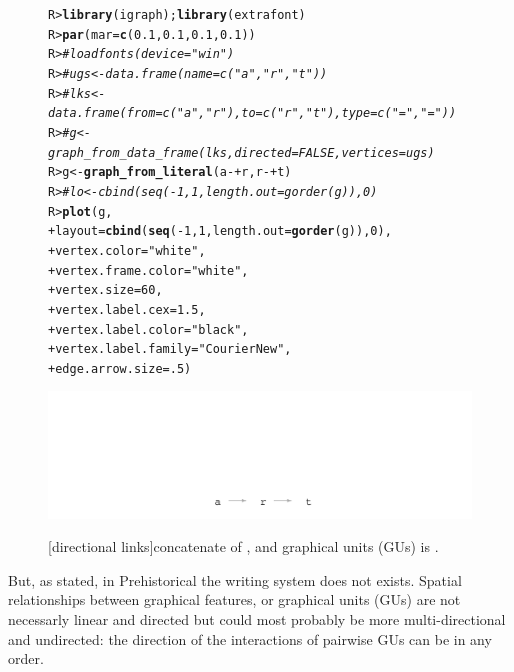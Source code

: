 \documentclass[article]{jss}\usepackage[]{graphicx}\usepackage[]{color}
\makeatletter
\def\maxwidth{ %
  \ifdim\Gin@nat@width>\linewidth
    \linewidth
  \else
    \Gin@nat@width
  \fi
}
\newcommand{\hlnum}[1]{\textcolor[rgb]{0.686,0.059,0.569}{#1}}%
\newcommand{\hlstr}[1]{\textcolor[rgb]{0.192,0.494,0.8}{#1}}%
\newcommand{\hlcom}[1]{\textcolor[rgb]{0.678,0.584,0.686}{\textit{#1}}}%
\newcommand{\hlopt}[1]{\textcolor[rgb]{0,0,0}{#1}}%
\newcommand{\hlstd}[1]{\textcolor[rgb]{0.345,0.345,0.345}{#1}}%
\newcommand{\hlkwb}[1]{\textcolor[rgb]{0.69,0.353,0.396}{#1}}%
\newcommand{\hlkwc}[1]{\textcolor[rgb]{0.333,0.667,0.333}{#1}}%
\newcommand{\hlkwd}[1]{\textcolor[rgb]{0.737,0.353,0.396}{\textbf{#1}}}%
\newenvironment{kframe}{%
 \def\at@end@of@kframe{}%
 \ifinner\ifhmode%
  \def\at@end@of@kframe{\end{minipage}}%
  \begin{minipage}{\columnwidth}%
 \fi\fi%
 \def\FrameCommand##1{\hskip\@totalleftmargin \hskip-\fboxsep
 \colorbox{shadecolor}{##1}\hskip-\fboxsep
     \hskip-\linewidth \hskip-\@totalleftmargin \hskip\columnwidth}%
 \MakeFramed {\advance\hsize-\width
   \@totalleftmargin\z@ \linewidth\hsize
   \@setminipage}}%
 {\par\unskip\endMakeFramed%
 \at@end@of@kframe}
\newenvironment{knitrout}{}{} %
\makeatother
\begin{document}
\begin{figure}[H]
\begin{knitrout}
\color{fgcolor}\begin{kframe}
\begin{alltt}
\hlstd{R> }\hlkwd{library}\hlstd{(igraph);}\hlkwd{library}\hlstd{(extrafont)}
\hlstd{R> }\hlkwd{par}\hlstd{(}\hlkwc{mar}\hlstd{=}\hlkwd{c}\hlstd{(}\hlnum{0.1}\hlstd{,}\hlnum{0.1}\hlstd{,}\hlnum{0.1}\hlstd{,}\hlnum{0.1}\hlstd{) )}
\hlstd{R> }\hlcom{# loadfonts(device = "win")}
\hlstd{R> }\hlcom{# ugs <- data.frame(name=c("a","r","t"))}
\hlstd{R> }\hlcom{# lks <- data.frame(from=c("a", "r"),to=c("r", "t"),type=c("=","="))}
\hlstd{R> }\hlcom{# g <- graph_from_data_frame(lks, directed=FALSE, vertices= ugs)}
\hlstd{R> }\hlstd{g} \hlkwb{<-} \hlkwd{graph_from_literal}\hlstd{(a}\hlopt{-+}\hlstd{r, r}\hlopt{-+}\hlstd{t)}
\hlstd{R> }\hlcom{# lo <- cbind(seq(-1,1,length.out = gorder(g)), 0)}
\hlstd{R> }\hlkwd{plot}\hlstd{(g,}
\hlstd{+  }     \hlkwc{layout} \hlstd{=} \hlkwd{cbind}\hlstd{(}\hlkwd{seq}\hlstd{(}\hlopt{-}\hlnum{1}\hlstd{,}\hlnum{1}\hlstd{,}\hlkwc{length.out} \hlstd{=} \hlkwd{gorder}\hlstd{(g)),} \hlnum{0}\hlstd{),}
\hlstd{+  }     \hlkwc{vertex.color}\hlstd{=}\hlstr{"white"}\hlstd{,}
\hlstd{+  }     \hlkwc{vertex.frame.color}\hlstd{=}\hlstr{"white"}\hlstd{,}
\hlstd{+  }     \hlkwc{vertex.size}\hlstd{=}\hlnum{60}\hlstd{,}
\hlstd{+  }     \hlkwc{vertex.label.cex}\hlstd{=}\hlnum{1.5}\hlstd{,}
\hlstd{+  }     \hlkwc{vertex.label.color}\hlstd{=}\hlstr{"black"}\hlstd{,}
\hlstd{+  }     \hlkwc{vertex.label.family}\hlstd{=}\hlstr{"Courier New"}\hlstd{,}
\hlstd{+  }     \hlkwc{edge.arrow.size}\hlstd{=}\hlnum{.5}\hlstd{)}
\end{alltt}
\end{kframe}
\includegraphics[width=\maxwidth]{figure/unnamed-chunk-1-1} 

\end{knitrout}
[directional links]{concatenate of ,  and  graphical units (GUs) is .}
\end{figure}

But, as stated, in Prehistorical the writing system does not exists. Spatial relationships between graphical features, or graphical units (GUs) are not necessarly linear and directed but could most probably be more multi-directional and undirected: the direction of the interactions of pairwise GUs can be in any order.  
\end{document}
